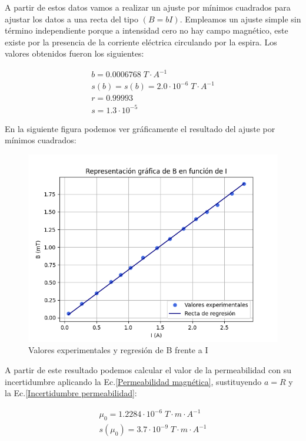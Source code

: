 \documentclass[a4paper,12pt,titlepage]{report}
\begin{document}
A partir de estos datos vamos a realizar un ajuste por mínimos cuadrados para ajustar los datos a una recta del tipo $(B=bI)$. Empleamos un ajuste simple sin término independiente porque a intensidad cero no hay campo magnético, este existe por la presencia de la corriente eléctrica circulando por la espira. Los valores obtenidos fueron los siguientes:

\begin{equation}
    \begin{gathered}
        b = 0.0006768 \; T\cdot A^{-1}\\
        s(b) = s(b) = 2.0 \cdot 10^{-6} \; T\cdot A^{-1} \\
        r = 0.99993 \\
        s = 1.3 \cdot 10^{-5}
    \end{gathered}
\end{equation}

En la siguiente figura podemos ver gráficamente el resultado del ajuste por mínimos cuadrados:

\begin{figure}
    \centering
    \includegraphics[width=0.85\linewidth]{Images/RegresionPermeabilidad.png}
    \caption{Valores experimentales y regresión de B frente a I}
\end{figure}

A partir de este resultado podemos calcular el valor de la permeabilidad con su incertidumbre aplicando la Ec.\ref{Permeabilidad magnética}, sustituyendo $a=R$ y la Ec.\ref{Incertidumbre permeabilidad}:

\begin{equation}
    \begin{gathered}
        \mu_0 = 1.2284 \cdot 10^{-6}\; T \cdot m \cdot A^{-1} \\
        s(\mu_0) = 3.7 \cdot 10^{-9}\; T \cdot m \cdot A^{-1}
    \end{gathered}
\end{equation}
\end{document}
